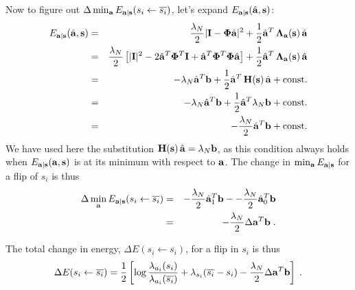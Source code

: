 \documentclass[12pt]{article}
\newcommand{\ba}{{\bf a}}
\newcommand{\bah}{\hat{\bf a}}
\newcommand{\bs}{{\bf s}}
\newcommand{\bI}{{\bf I}}
\newcommand{\bPhi}{{\bf \Phi}}
\newcommand{\bLambdaa}{{\bf \Lambda_a}}
\newcommand{\bb}{{\bf b}}
\def\lnot{\overline}
\newcommand{\flipsi}{s_i\leftarrow\lnot{s_i}}
\newcommand{\bH}{{\bf H}}
\begin{document}
Now to figure out $\Delta \min_{\ba} E_{\ba|\bs}(\flipsi)$, let's expand
$E_{\ba|\bs}(\bah,\bs)$:
\begin{eqnarray}
E_{\ba|\bs}(\bah,\bs) & = & \frac{\lambda_N}{2}|\bI-\bPhi \bah|^2 + 
                          \frac{1}{2} \bah^T \, \bLambdaa(\bs)\, \bah \\
 & = & \frac{\lambda_N}{2}
         \left[ |\bI|^2 - 2\bah^T\bPhi^T\bI + \bah^T\bPhi^T\bPhi\bah \right] +
       \frac{1}{2} \bah^T \, \bLambdaa(\bs)\, \bah \\ 
 & = & -\lambda_N \bah^T\bb 
       + \frac{1}{2} \bah^T\, \bH(\bs)\, \bah + \mbox{const.}\\
 & = & -\lambda_N \bah^T\bb + \frac{1}{2} \bah^T \lambda_N \bb + \mbox{const.}\\
 & = & -\frac{\lambda_N}{2} \bah^T\bb + \mbox{const.}
\end{eqnarray}
We have used here the substitution $\bH(\bs) \, \bah = \lambda_N \bb$,
as this condition always holds when $E_{\ba|\bs}(\ba,\bs)$ is at its
minimum with respect to $\ba$.  The change in $\min_{\ba} E_{\ba|\bs}$
for a flip of $s_i$ is thus
\begin{eqnarray}
\Delta \min_\ba E_{\ba|\bs}(\flipsi) & = & 
  -\frac{\lambda_N}{2} \bah_1^T \bb 
  - -\frac{\lambda_N}{2} \bah_0^T \bb \\
 & = & -\frac{\lambda_N}{2} \Delta\ba^T \bb \; .
\end{eqnarray}

The total change in energy, $\Delta E(\flipsi)$, for a flip in $s_i$ is thus
\begin{equation}
\Delta E(\flipsi) = \frac{1}{2} 
 \left[ \log \frac{\lambda_{a_i}(s_i)}{\lambda_{a_i}(\lnot{s_i})}
        + \lambda_{s_i}(\lnot{s_i}-s_i) 
  -\frac{\lambda_N}{2} \Delta\ba^T \bb \right] \; .
\label{eq:dE1}
\end{equation}
\end{document}
